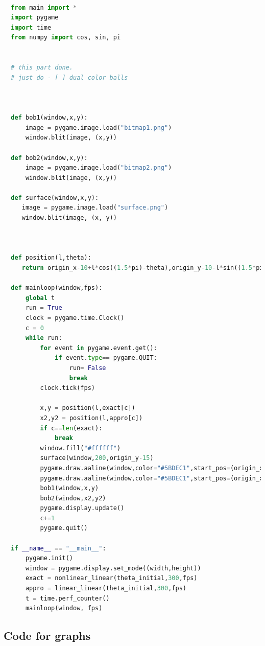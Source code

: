 \documentclass{article}
\begin{document}
\begin{lstlisting}[language=Python]

  from main import *
  import pygame
  import time
  from numpy import cos, sin, pi


  # this part done.
  # just do - [ ] dual color balls



  def bob1(window,x,y):
      image = pygame.image.load("bitmap1.png")
      window.blit(image, (x,y))

  def bob2(window,x,y):
      image = pygame.image.load("bitmap2.png")
      window.blit(image, (x,y))

  def surface(window,x,y):
     image = pygame.image.load("surface.png")
     window.blit(image, (x, y))



  def position(l,theta):
     return origin_x-10+l*cos((1.5*pi)-theta),origin_y-10-l*sin((1.5*pi)-theta)

  def mainloop(window,fps):
      global t
      run = True
      clock = pygame.time.Clock()
      c = 0
      while run:
          for event in pygame.event.get():
              if event.type== pygame.QUIT:
                  run= False
                  break
          clock.tick(fps)

          x,y = position(l,exact[c])
          x2,y2 = position(l,appro[c])
          if c==len(exact):
              break
          window.fill("#ffffff")
          surface(window,200,origin_y-15)
          pygame.draw.aaline(window,color="#5BDEC1",start_pos=(origin_x,origin_y),end_pos=(x+radius,y+radius))
          pygame.draw.aaline(window,color="#5BDEC1",start_pos=(origin_x,origin_y),end_pos=(x2+10,y2+10))
          bob1(window,x,y)
          bob2(window,x2,y2)
          pygame.display.update()
          c+=1
          pygame.quit()

  if __name__ == "__main__":
      pygame.init()
      window = pygame.display.set_mode((width,height))
      exact = nonlinear_linear(theta_initial,300,fps)
      appro = linear_linear(theta_initial,300,fps)
      t = time.perf_counter()
      mainloop(window, fps)


\end{lstlisting}

\subsection{Code for graphs}
\label{sec:orgb9da19f}
\end{document}
